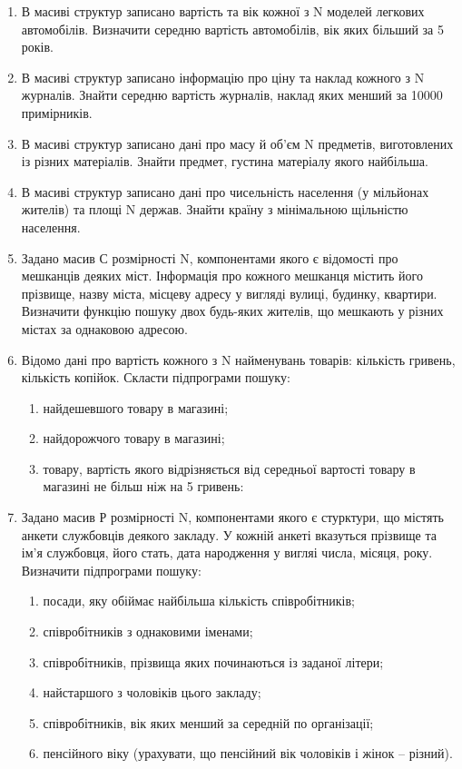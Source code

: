 \documentclass[]{article}
\makeatletter
\newcommand{\xslalph}[1]{\expandafter\@xslalph\csname c@#1\endcsname}
\newcommand{\@xslalph}[1]{%
    \ifcase#1\or а\or б\or в\or г\or д\or e\or є\or ж\or з\or i%
    \or й\or к\or л\or м\or н\or о\or п\or р\or с\or т%
    \or у\or ф\or х\or ц\or ч\or ш\or ю\or я\or аа\or бб\or вв%
    \else\@ctrerr\fi%
}
\makeatother
\begin{document}
\begin{enumerate}
\begin{enumerate}[label=\xslalph*)]
\begin{enumerate}
\begin{enumerate}[label=\xslalph*)]
\begin{enumerate}
\item
  В масиві структур записано вартість та вік кожної з N моделей легкових
  автомобілів. Визначити середню вартість автомобілів, вік яких більший
  за 5 років.
\item
  В масиві структур записано інформацію про ціну та наклад кожного з N
  журналів. Знайти середню вартість журналів, наклад яких менший за
  10000 примірників.
\item
  В масиві структур записано дані про масу й об'єм N предметів,
  виготовлених із різних матеріалів. Знайти предмет, густина матеріалу
  якого найбільша.
\item
  В масиві структур записано дані про чисельність населення (у мільйонах
  жителів) та площі N держав. Знайти країну з мінімальною щільністю
  населення.
\item
  Задано масив С розмірності N, компонентами якого є відомості про
  мешканців деяких міст. Інформація про кожного мешканця містить його
  прізвище, назву міста, місцеву адресу у вигляді вулиці, будинку,
  квартири. Визначити функцію пошуку двох будь-яких жителів, що мешкають
  у різних містах за однаковою адресою.
\item
  Відомо дані про вартість кожного з N найменувань товарів: кількість
  гривень, кількість копійок. Скласти підпрограми пошуку:
\begin{enumerate}[label=\xslalph*)]
\item найдешевшого товару в магазині;
\item найдорожчого товару в магазині;
\item товару, вартість якого відрізняється від середньої вартості товару в магазині не більш ніж на 5 гривень:

\end{enumerate}

\item
  Задано масив Р розмірності N, компонентами якого є стурктури, що
  містять анкети службовців деякого закладу. У кожній анкеті вказуться
  прізвище та ім'я службовця, його стать, дата народження у вигляі
  числа, місяця, року. Визначити підпрограми пошуку:
\begin{enumerate}[label=\xslalph*)]
\item посади, яку обіймає найбільша кількість співробітників;
\item співробітників з однаковими іменами;
\item співробітників, прізвища яких починаються із заданої літери;
\item найстаршого з чоловіків цього закладу;
\item співробітників, вік яких менший за середній по організації;
\item пенсійного віку (урахувати, що пенсійний вік чоловіків і жінок --
різний).
\end{enumerate}


\end{enumerate}
\end{enumerate}
\end{enumerate}
\end{enumerate}
\end{enumerate}
\end{document}
